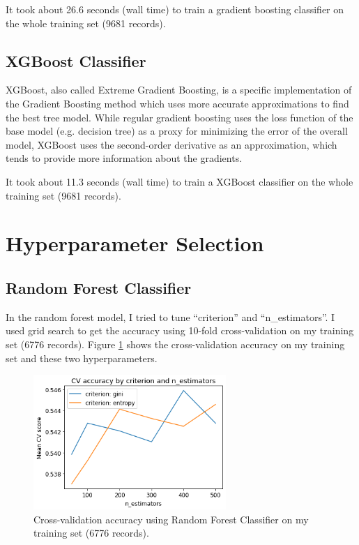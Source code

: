 \documentclass[11pt]{article}
\begin{document}
It took about 26.6 seconds (wall time) to train a gradient boosting classifier on the whole training set (9681 records).

\subsection{ XGBoost Classifier}

XGBoost, also called Extreme Gradient Boosting, is a specific implementation of the Gradient Boosting method which uses more accurate approximations to find the best tree model\cite{chen2015xgboost}. While regular gradient boosting uses the loss function of the base model (e.g. decision tree) as a proxy for minimizing the error of the overall model, XGBoost uses the second-order derivative as an approximation, which tends to provide more information about the gradients\cite{chen2015xgboost}.

It took about 11.3 seconds (wall time) to train a XGBoost classifier on the whole training set (9681 records).

\section{Hyperparameter Selection}

\subsection{ Random Forest Classifier}
In the random forest model, I tried to tune ``criterion'' and ``n\_estimators''. I used grid search to get the accuracy using 10-fold cross-validation on my training set (6776 records). Figure \ref{cv_rf} shows the cross-validation accuracy on my training set and these two hyperparameters. 

\begin{figure}[H]
  \caption{Cross-validation accuracy using Random Forest Classifier on my training set (6776 records).}
  \label{cv_rf}
  \centering
  \includegraphics[width=0.65\textwidth]{../img/cv_rf.png}
\end{figure}
\end{document}
